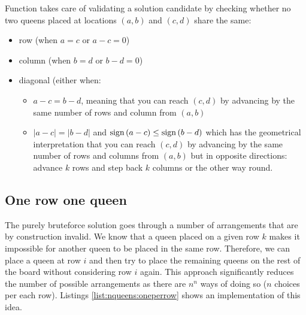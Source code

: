 Function  takes care of validating a solution candidate by checking whether
no two queens placed at locations $(a,b)$ and $(c,d)$ share the same:
\begin{itemize}
	\item row (when $a = c$  or $a-c=0$)
	\item column (when $b = d$  or $b-d=0$) 
	\item diagonal (either when:
	\begin{itemize}
		\item $a-c = b-d$, meaning that you can reach $(c,d)$ by advancing by the same number of rows and column from $(a,b)$ 
		\item $|a-c| = |b-d|$ and $\operatorname{sign}{(a-c)} \leq \operatorname{sign}{(b-d)}$  which has the geometrical interpretation that you can reach $(c,d)$ by advancing by the same number of rows and columns	from $(a,b)$ but in opposite directions: advance $k$ rows and step back $k$ columns or the	other way round.
	\end{itemize} 
\end{itemize}



\subsection{One row one queen}
\label{nqueens:sec:onerowonequeen}
The purely bruteforce solution goes through a number of arrangements that are by construction invalid. 
We know that a queen placed on a given row $k$ makes it impossible for another queen to
be placed in the same row. 
Therefore, we can place a queen at row $i$ and then try to place the remaining queens on the rest of the board without considering row $i$ again. 
This approach significantly reduces the number of possible arrangements as there are $n^n$ ways of doing so ($n$ choices per each row).
Listings \ref{list:nqueens:oneperrow} shows an implementation of this idea.




